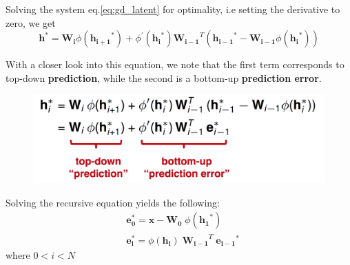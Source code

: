 \documentclass[main]{subfiles}
\begin{document}
Solving the system eq.\ref{eq:gd_latent} for optimality, i.e setting the derivative to zero, we get
\begin{equation}
    \bm{h}^* = \bm{W_i} \phi (\bm{h_{i+1}}^*) + \phi^\prime (\bm{h_{i}}^*)\bm{W_{i-1}}^T (\bm{h_{i-1}}^* - \bm{W_{i-1}}\phi (\bm{h_{i}}^*))
\end{equation}

\noindent With a closer look into this equation, we note that the first term corresponds to top-down \textbf{prediction}, while the second is a bottom-up \textbf{prediction error}.
\begin{figure}[H]
        \centering
        \includegraphics[width=0.9\linewidth]{06_PredictionErrorsDuringPerceptionAndLearning/figures/optimal_latent_error.png}
        \label{fig:prediction_error}
\end{figure}

\noindent Solving the recursive equation yields the following:
\begin{equation}
\begin{split}
   &\bm{e_0^*} = \bm{x} - \bm{W_0} \; \phi(\bm{h_1}^*)\\
   &\bm{e_i^*} = \phi (\bm{h_i}) \; \bm{W_{i-1}}^T \; \bm{e_{i-1}}^*
\end{split}
\end{equation}
where $0 < i < N$\\ 


\end{document}
